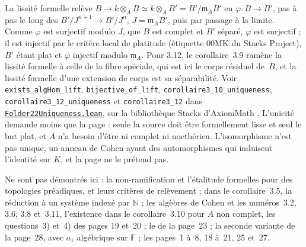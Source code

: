 \noindent La lissité formelle relève $B \to k \otimes_A B \simeq k \otimes_A B' = B'/\mathfrak m_A B'$ en $\varphi : B \to B'$, pas à pas le long des $B'/J^{n+1} \to B'/J^n$, $J = \mathfrak m_A B'$, puis par passage à la limite. Comme $\varphi$ est surjectif modulo $J$, que $B$ est complet et $B'$ séparé, $\varphi$ est surjectif ; il est injectif par le critère local de platitude (étiquette 00MK du Stacks Project), $B'$ étant plat et $\varphi$ injectif modulo $\mathfrak m_A$. Pour 3.12, le corollaire~3.9 ramène la lissité formelle à celle de la fibre spéciale, qui est ici le corps résiduel de~$B$, et la lissité formelle d'une extension de corps est sa séparabilité. Voir \texttt{exists\_algHom\_lift}, \texttt{bijective\_of\_lift}, \texttt{corollaire3\_10\_uniqueness}, \texttt{corollaire3\_12\_uniqueness} et \texttt{corollaire3\_12} dans \href{\leanblobmain/RingTheory/Folder22Uniqueness.lean}{\texttt{Folder22Uniqueness.\allowbreak{}lean}}, sur la bibliothèque Stacks d'AxiomMath \cite{axiomstacks}. L'unicité demande moins que la page : seule la source doit être formellement lisse et seul le but plat, et $A$ n'a besoin d'être ni complet ni noethérien. L'isomorphisme n'est pas unique, un anneau de Cohen ayant des automorphismes qui induisent l'identité sur $K$, et la page ne le prétend pas.

Ne sont pas démontrés ici : la non-ramification et l'étalitude formelles pour des topologies préadiques, et leurs critères de relèvement ; dans le corollaire~3.5, la réduction à un système indexé par $\mathbb N$ ; les algèbres de Cohen et les numéros~3.2, 3.6, 3.8 et~3.11, l'existence dans le corollaire~3.10 pour $A$ non complet, les questions~3) et~4) des pages 19 et~20 ; le  de la page~23 ; la seconde variante de la page~28, avec $a_1$ algébrique sur $\mathbb F$ ; les pages~1 à~8, 18 à~21, 25 et~27.
